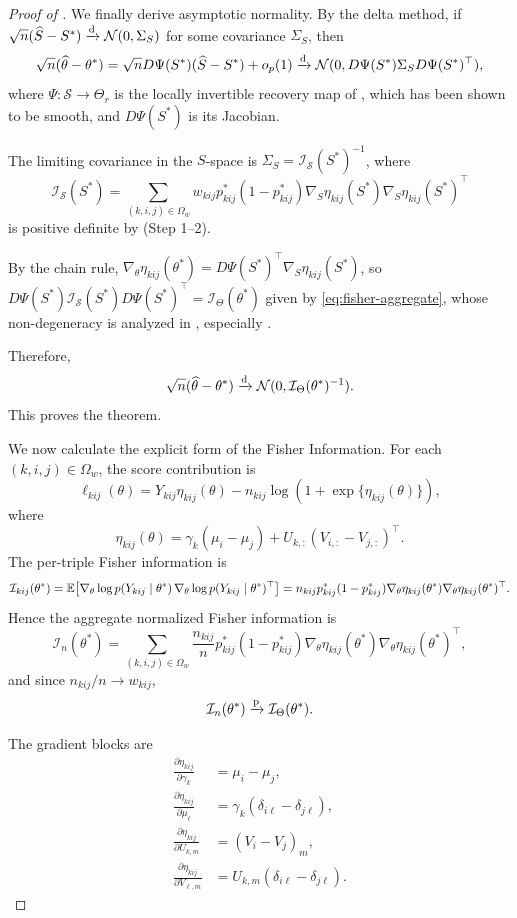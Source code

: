 \documentclass{article}
\begin{document}
\begin{bibunit}[unsrtnat]
\begin{proof}[Proof of ]
We finally derive asymptotic normality. 
By the delta method, if $\sqrt{n}(\widehat S - S^*) \xrightarrow{\textup{d}} \mathcal{N}(0, \Sigma_S)$ for some covariance $\Sigma_S$, then
\[
\sqrt{n}(\widehat\theta - \theta^*) = \sqrt{n} D\Psi(S^*)(\widehat S - S^*) + o_p(1) \xrightarrow{\textup{d}} \mathcal{N}(0, D\Psi(S^*) \Sigma_S D\Psi(S^*)^\top),
\]
where $\Psi: \mathcal{S} \to \Theta_r$ is the locally invertible recovery map of , which has been shown to be smooth, and $D\Psi(S^*)$ is its Jacobian.

The limiting covariance in the $S$-space is $\Sigma_S = \mathcal{I}_{\mathcal{S}}(S^*)^{-1}$, where
\[
\mathcal{I}_{\mathcal{S}}(S^*) = \sum_{(k,i,j)\in\Omega_w} w_{kij} p_{kij}^*(1-p_{kij}^*) \nabla_S \eta_{kij}(S^*) \nabla_S \eta_{kij}(S^*)^\top
\]
is positive definite by  (Step 1--2).

By the chain rule, $\nabla_\theta \eta_{kij}(\theta^*) = D\Psi(S^*)^\top \nabla_S \eta_{kij}(S^*)$, so
$D\Psi(S^*) \mathcal{I}_{\mathcal{S}}(S^*) D\Psi(S^*)^\top = \mathcal{I}_{\Theta}(\theta^*)$ given by \eqref{eq:fisher-aggregate}, whose non-degeneracy is analyzed in , especially .

Therefore,
\[
\sqrt{n}(\widehat\theta - \theta^*) \xrightarrow{\textup{d}} \mathcal{N}(0, \mathcal{I}_{\Theta}(\theta^*)^{-1}).
\]
This proves the theorem.

We now calculate the explicit form of the Fisher Information.
For each $(k,i,j)\in\Omega_w$, the score contribution is
\[
\ell_{kij}(\theta)
=
Y_{kij}\eta_{kij}(\theta)-n_{kij}\log(1+\exp\{\eta_{kij}(\theta)\}),
\]
where
\[
\eta_{kij}(\theta)=\gamma_k(\mu_i-\mu_j)+U_{k,:}(V_{i,:}-V_{j,:})^\top.
\]
The per-triple Fisher information is
\[
\mathcal I_{kij}(\theta^\ast)
=
\mathbb{E}\!\left[
\nabla_\theta\log p(Y_{kij}\mid\theta^\ast)\,
\nabla_\theta\log p(Y_{kij}\mid\theta^\ast)^\top
\right]
=
n_{kij}p_{kij}^\ast(1-p_{kij}^\ast)
\nabla_\theta\eta_{kij}(\theta^\ast)\nabla_\theta\eta_{kij}(\theta^\ast)^\top.
\]
Hence the aggregate normalized Fisher information is
\[
\mathcal I_n(\theta^\ast)
=
\sum_{(k,i,j)\in\Omega_w}
\frac{n_{kij}}{n}
p_{kij}^\ast(1-p_{kij}^\ast)
\nabla_\theta\eta_{kij}(\theta^\ast)\nabla_\theta\eta_{kij}(\theta^\ast)^\top,
\]
and since $n_{kij}/n\to w_{kij}$,
\[
\mathcal I_n(\theta^\ast)\xrightarrow{\textup{p}} \mathcal I_\Theta(\theta^\ast).
\]

The gradient blocks are
\begin{align*}
\frac{\partial \eta_{kij}}{\partial \gamma_k} &= \mu_i-\mu_j,\\
\frac{\partial \eta_{kij}}{\partial \mu_\ell} &= \gamma_k(\delta_{i\ell}-\delta_{j\ell}),\\
\frac{\partial \eta_{kij}}{\partial U_{k,m}} &= (V_i-V_j)_m,\\
\frac{\partial \eta_{kij}}{\partial V_{\ell,m}} &= U_{k,m}(\delta_{i\ell}-\delta_{j\ell}).
\end{align*}
\end{proof}


\end{bibunit}
\end{document}
